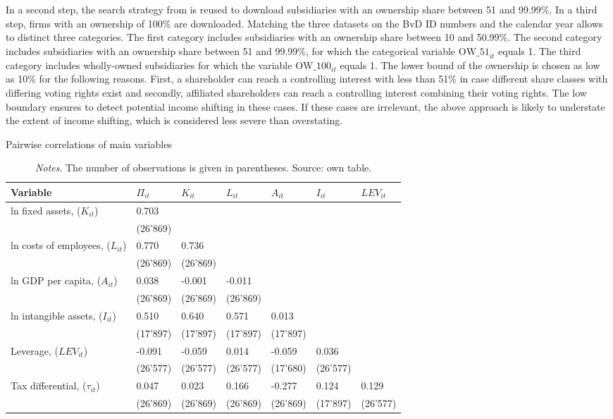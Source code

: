 \documentclass[10pt,twocolumn,oneside,cmyk]{article}
\begin{document}
In a second step, the search strategy from  is reused to download subsidiaries with an ownership share between 51 and 99.99\%. In a third step, firms with an ownership of 100\% are downloaded. Matching the three datasets on the BvD ID numbers and the calendar year allows to distinct three categories. The first category includes subsidiaries with an ownership share between 10 and 50.99\%. The second category includes subsidiaries with an ownership share between 51 and 99.99\%, for which the categorical variable $\text{OW\_51}_{it}$ equals 1. The third category includes wholly-owned subsidiaries for which the variable $\text{OW\_100}_{it}$ equals 1. The lower bound of the ownership is chosen as low as 10\% for the following reasons. First, a shareholder can reach a controlling interest with less than 51\% in case different share classes with differing voting rights exist and secondly, affiliated shareholders can reach a controlling interest combining their voting rights. The low boundary ensures to detect potential income shifting in these cases. If these cases are irrelevant, the above approach is likely to understate the extent of income shifting, which is considered less severe than overstating.

\begin{table*}[t]
\footnotesize
 \begin{center}
  \captionsetup{width=0.72\textwidth}
   \caption{Pairwise correlations of main variables}\label{tab3}
    \begin{tabularx}{0.72\textwidth}{l *{6}{Y}}
     \toprule
     Variable &$\Pi_{it}$ &$K_{it}$ &$L_{it}$ &$A_{it}$ &$I_{it}$ &$LEV_{it}$\\
     \midrule
     ln fixed assets, ($K_{it}$) &0.703 & & & &\\
     &(26'869) & & & &\\
     ln costs of employees, ($L_{it}$) &0.770 &0.736 & & &\\
     &(26'869) &(26'869) & & &\\
     ln GDP per capita, ($A_{it}$) & 0.038 &-0.001 &-0.011 & &\\
     &(26'869) &(26'869) &(26'869) & &\\
     ln intangible assets, ($I_{it}$)& 0.510 &0.640 &0.571 &0.013 &\\
     &(17'897) &(17'897) &(17'897) &(17'897)\\
     Leverage, ($LEV_{it}$) &-0.091 &-0.059 &0.014 &-0.059 &0.036\\
     &(26'577) &(26'577) &(26'577) &(17'680) &(26'577)\\
     Tax differential, ($\tau_{it}$) &0.047 &0.023 &0.166 &-0.277 &0.124 &0.129\\
     &(26'869) &(26'869) &(26'869) &(26'869) &(17'897) &(26'577)\\
    \bottomrule
   \end{tabularx}
  \caption*{\footnotesize{\textit{Notes}. The number of observations is given in parentheses. Source: own table.}}
 \end{center}
\end{table*}
\end{document}

